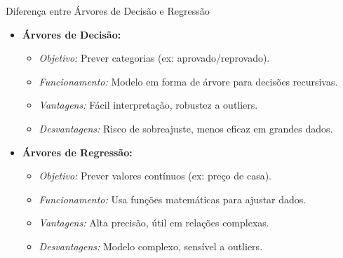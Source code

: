 \documentclass[handout,aspectratio = 169]{beamer}
\begin{document}
\begin{frame}{Diferença entre Árvores de Decisão e Regressão}
\begin{itemize}
    \item \textbf{Árvores de Decisão:}
    \begin{itemize}
        \item \textit{Objetivo:} Prever categorias (ex: aprovado/reprovado).
        \item \textit{Funcionamento:} Modelo em forma de árvore para decisões recursivas.
        \item \textit{Vantagens:} Fácil interpretação, robustez a outliers.
        \item \textit{Desvantagens:} Risco de sobreajuste, menos eficaz em grandes dados.
    \end{itemize} 
    \vspace{1em} %
    \item \textbf{Árvores de Regressão:}
    \begin{itemize}
        \item \textit{Objetivo:} Prever valores contínuos (ex: preço de casa).
        \item \textit{Funcionamento:} Usa funções matemáticas para ajustar dados.
        \item \textit{Vantagens:} Alta precisão, útil em relações complexas.
        \item \textit{Desvantagens:} Modelo complexo, sensível a outliers.
    \end{itemize}
\end{itemize}

\end{frame}
\end{document}
